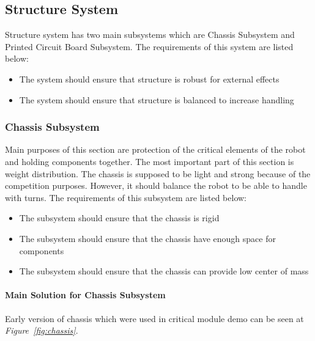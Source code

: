\documentclass[a4paper,12pt]{article}
\begin{document}
	\subsection{Structure System}
	
	Structure system has two main subsystems which are Chassis Subsystem and Printed Circuit Board Subsystem. The requirements of this system are listed below:
	\begin{itemize}
		\item The system should	ensure that structure is robust for external effects 
		\item The system should	ensure that structure is balanced to increase handling
		
	\end{itemize}
	
	
	
	\subsubsection{Chassis Subsystem}
	Main purposes of this section are protection of the critical elements of the robot and holding components together. The most important part of this section is weight distribution. The chassis is supposed to be light and strong because of the competition purposes. However, it should balance the robot to be able to handle with turns. The requirements of this subsystem are listed below:
	\begin{itemize}
		\item The subsystem should ensure that the chassis is rigid 
		\item The subsystem should ensure that the chassis have enough space for components
		\item The subsystem should ensure that the chassis can provide low center of mass 
	\end{itemize}
	
	\paragraph{Main Solution for Chassis Subsystem}
	
		Early version of chassis which were used in critical module demo can be seen at \textit{Figure~\ref{fig:chassis}}. 
	
	
\end{document}
